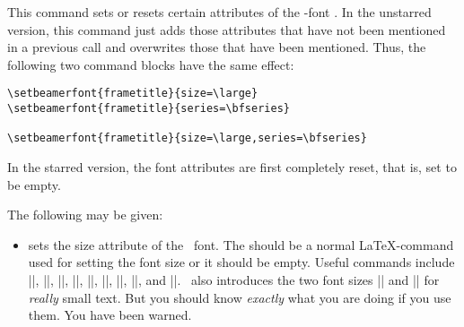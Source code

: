 \begin{command}{\setbeamerfont\opt{|*|}}
  This command sets or resets certain attributes of the \beamer-font . In the unstarred version, this command just adds those attributes that have not been mentioned in a previous call and overwrites those that have been mentioned. Thus, the following two command blocks have the same effect:

  \example
\begin{verbatim}
\setbeamerfont{frametitle}{size=\large}
\setbeamerfont{frametitle}{series=\bfseries}

\setbeamerfont{frametitle}{size=\large,series=\bfseries}
\end{verbatim}

  In the starred version, the font attributes are first completely reset, that is, set to be empty.

  The following  may be given:
  \begin{itemize}
  \item {} sets the size attribute of the \beamer\ font. The  should be a normal \LaTeX-command used for setting the font size or it should be empty. Useful commands include |\tiny|, |\scriptsize|, |\footnotesize|, |\small|, |\normalsize|, |\large|, |\Large|, |\huge|, and |\Huge|. \beamer\ also introduces the two font sizes |\Tiny| and |\TINY| for \emph{really} small text. But you should know \emph{exactly} what you are doing if you use them. You have been warned.


\end{itemize}
\end{command}
